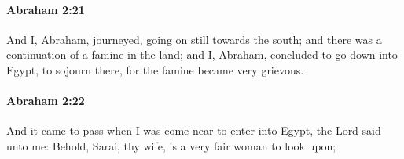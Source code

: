 
		\paragraph{Abraham 2:21} %
			\label{ABRAHAM-2-21}

			And I, Abraham, journeyed, going on still towards the south; and there was a continuation of a famine in the land; and I, Abraham, concluded to go down into Egypt, to sojourn there, for the famine became very grievous.


		\paragraph{Abraham 2:22} %
			\label{ABRAHAM-2-22}

			And it came to pass when I was come near to enter into Egypt, the Lord said unto me: Behold, Sarai, thy wife, is a very fair woman to look upon;


